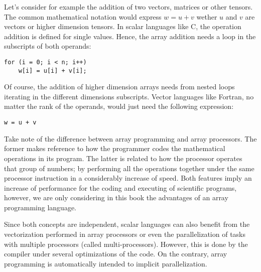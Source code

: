 Let's consider for example the addition of two vectors, matrices or other tensors. 
The common mathematical notation would express $w = u + v$ wether $u$ and $v$ are vectors or higher dimension tensors. 
In scalar languages like C, the operation addition is defined for single values. 
Hence, the array addition needs a loop in the subscripts of both operands:
\vspace{-0.3cm}
\begin{verbatim}
for (i = 0; i < n; i++)
    w[i] = u[i] + v[i];
\end{verbatim}
\vspace{-0.3cm}
Of course, the addition of higher dimension arrays needs from nested loops 
iterating in the different dimensions subscripts. 
Vector languages like Fortran, no matter the rank of the operands, 
would just need the following expression:
\vspace{-0.3cm}
\begin{verbatim}
w = u + v
\end{verbatim}
\vspace{-0.3cm}

Take note of the difference between array programming and array processors. 
The former makes reference to how the programmer codes the mathematical operations in its program. 
The latter is related to how the processor operates that group of numbers; 
by performing all the operations together under the same processor instruction in a considerably increase of speed.
Both features imply an increase of performance for the coding and executing of scientific programs, 
however, we are only considering in this book the advantages of an array programming language.

Since both concepts are independent, scalar languages can also benefit 
from the vectorization performed in array processors or even 
the parallelization of tasks with multiple processors (called multi-processors). 
However, this is done by the compiler under several optimizations of the code.
On the contrary, array programming is automatically intended to implicit parallelization. 


